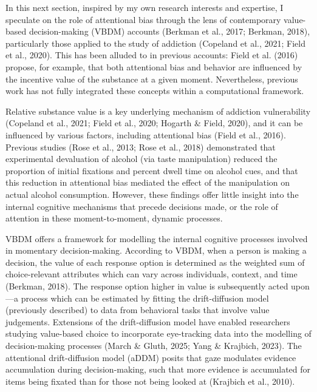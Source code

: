 \documentclass[authordate, reflection, issue]{jote-new-article}
\begin{document}
	In this next section, inspired by my own research interests and expertise, I speculate on the role of attentional bias through the lens of contemporary value-based decision-making (VBDM) accounts (Berkman et al., 2017; Berkman, 2018), particularly those applied to the study of addiction (Copeland et al., 2021; Field et al., 2020). This has been alluded to in previous accounts: Field et al. (2016) propose, for example, that both attentional bias and behavior are influenced by the incentive value of the substance at a given moment. Nevertheless, previous work has not fully integrated these concepts within a computational framework.



	Relative substance value is a key underlying mechanism of addiction vulnerability (Copeland et al., 2021; Field et al., 2020; Hogarth \& Field, 2020), and it can be influenced by various factors, including attentional bias (Field et al., 2016). Previous studies (Rose et al., 2013; Rose et al., 2018) demonstrated that experimental devaluation of alcohol (via taste manipulation) reduced the proportion of initial fixations and percent dwell time on alcohol cues, and that this reduction in attentional bias mediated the effect of the manipulation on actual alcohol consumption. However, these findings offer little insight into the internal cognitive mechanisms that precede decisions made, or the role of attention in these moment-to-moment, dynamic processes.



	VBDM offers a framework for modelling the internal cognitive processes involved in momentary decision-making. According to VBDM, when a person is making a decision, the value of each response option is determined as the weighted sum of choice-relevant attributes which can vary across individuals, context, and time (Berkman, 2018). The response option higher in value is subsequently acted upon—a process which can be estimated by fitting the drift-diffusion model (previously described) to data from behavioral tasks that involve value judgements. Extensions of the drift-diffusion model have enabled researchers studying value-based choice to incorporate eye-tracking data into the modelling of decision-making processes (March \& Gluth, 2025; Yang \& Krajbich, 2023). The attentional drift-diffusion model (aDDM) posits that gaze modulates evidence accumulation during decision-making, such that more evidence is accumulated for items being fixated than for those not being looked at (Krajbich et al., 2010).
\end{document}
